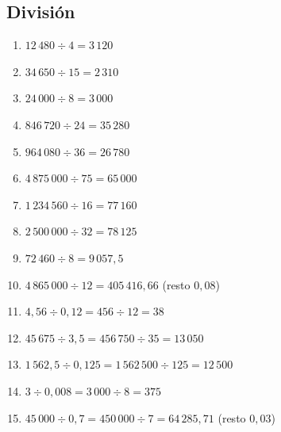 \documentclass[12pt, letterpaper]{article}
\begin{document}
  \subsection*{División}
  \begin{enumerate}[leftmargin=*, label=\textbf{\arabic*.}]
    \item $12\,480 \div 4 = 3\,120$
    \item $34\,650 \div 15 = 2\,310$
    \item $24\,000 \div 8 = 3\,000$
    \item $846\,720 \div 24 = 35\,280$
    \item $964\,080 \div 36 = 26\,780$
    \item $4\,875\,000 \div 75 = 65\,000$
    \item $1\,234\,560 \div 16 = 77\,160$
    \item $2\,500\,000 \div 32 = 78\,125$
    \item $72\,460 \div 8 = 9\,057{,}5$
    \item $4\,865\,000 \div 12 = 405\,416{,}66$ (resto $0{,}08$)
    \item $4{,}56 \div 0{,}12 = 456 \div 12 = 38$
    \item $45\,675 \div 3{,}5 = 456\,750 \div 35 = 13\,050$
    \item $1\,562{,}5 \div 0{,}125 = 1\,562\,500 \div 125 = 12\,500$
    \item $3 \div 0{,}008 = 3\,000 \div 8 = 375$
    \item $45\,000 \div 0{,}7 = 450\,000 \div 7 = 64\,285{,}71$ (resto $0{,}03$)
  \end{enumerate}
\end{document}
